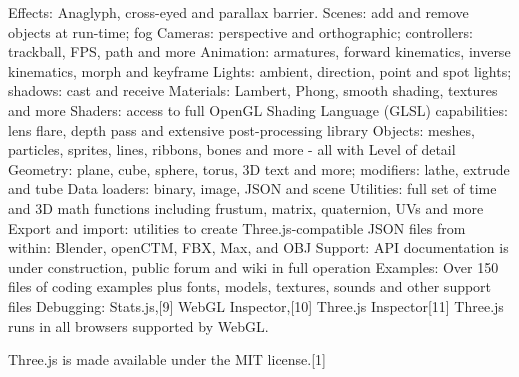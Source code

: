 Effects: Anaglyph, cross-eyed and parallax barrier.
Scenes: add and remove objects at run-time; fog
Cameras: perspective and orthographic; controllers: trackball, FPS, path and more
Animation: armatures, forward kinematics, inverse kinematics, morph and keyframe
Lights: ambient, direction, point and spot lights; shadows: cast and receive
Materials: Lambert, Phong, smooth shading, textures and more
Shaders: access to full OpenGL Shading Language (GLSL) capabilities: lens flare, depth pass and extensive post-processing library
Objects: meshes, particles, sprites, lines, ribbons, bones and more - all with Level of detail
Geometry: plane, cube, sphere, torus, 3D text and more; modifiers: lathe, extrude and tube
Data loaders: binary, image, JSON and scene
Utilities: full set of time and 3D math functions including frustum, matrix, quaternion, UVs and more
Export and import: utilities to create Three.js-compatible JSON files from within: Blender, openCTM, FBX, Max, and OBJ
Support: API documentation is under construction, public forum and wiki in full operation
Examples: Over 150 files of coding examples plus fonts, models, textures, sounds and other support files
Debugging: Stats.js,[9] WebGL Inspector,[10] Three.js Inspector[11]
Three.js runs in all browsers supported by WebGL.

Three.js is made available under the MIT license.[1]
